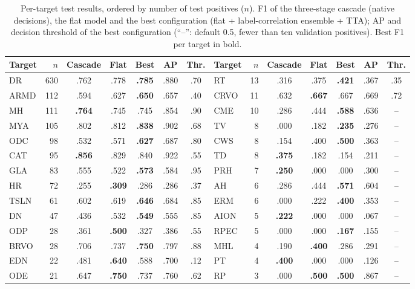\documentclass[conference]{IEEEtran}
\newcommand{\B}[1]{\textbf{#1}}
\begin{document}
\begin{table}[t]
\centering
\caption{Per-target test results, ordered by number of test positives ($n$). F1 of the
three-stage cascade (native decisions), the flat model and the best configuration
(flat + label-correlation ensemble + TTA); AP and decision threshold of the best
configuration (``--'': default 0.5, fewer than ten validation positives). Best F1 per
target in bold.}
\label{tab:pertarget}
\setlength{\tabcolsep}{4.2pt}
\footnotesize
\begin{tabular}{@{}lrccccc|lrccccc@{}}
\toprule
Target & $n$ & Cascade & Flat & Best & AP & Thr. & Target & $n$ & Cascade & Flat & Best & AP & Thr.\\
\midrule
DR & 630 & .762 & .778 & \B{.785} & .880 & .70 & RT & 13 & .316 & .375 & \B{.421} & .367 & .35\\
ARMD & 112 & .594 & .627 & \B{.650} & .657 & .40 & CRVO & 11 & .632 & \B{.667} & .667 & .669 & .72\\
MH & 111 & \B{.764} & .745 & .745 & .854 & .90 & CME & 10 & .286 & .444 & \B{.588} & .636 & --\\
MYA & 105 & .802 & .812 & \B{.838} & .902 & .68 & TV & 8 & .000 & .182 & \B{.235} & .276 & --\\
ODC & 98 & .532 & .571 & \B{.627} & .687 & .80 & CWS & 8 & .154 & .400 & \B{.500} & .363 & --\\
CAT & 95 & \B{.856} & .829 & .840 & .922 & .55 & TD & 8 & \B{.375} & .182 & .154 & .211 & --\\
GLA & 83 & .555 & .522 & \B{.573} & .584 & .95 & PRH & 7 & \B{.250} & .000 & .000 & .300 & --\\
HR & 72 & .255 & \B{.309} & .286 & .286 & .37 & AH & 6 & .286 & .444 & \B{.571} & .604 & --\\
TSLN & 61 & .602 & .619 & \B{.646} & .684 & .85 & ERM & 6 & .000 & .222 & \B{.400} & .353 & --\\
DN & 47 & .436 & .532 & \B{.549} & .555 & .85 & AION & 5 & \B{.222} & .000 & .000 & .067 & --\\
ODP & 28 & .361 & \B{.500} & .327 & .386 & .55 & RPEC & 5 & .000 & .000 & \B{.167} & .155 & --\\
BRVO & 28 & .706 & .737 & \B{.750} & .797 & .88 & MHL & 4 & .190 & \B{.400} & .286 & .291 & --\\
EDN & 22 & .481 & \B{.640} & .588 & .700 & .12 & PT & 4 & \B{.400} & .000 & .000 & .126 & --\\
ODE & 21 & .647 & \B{.750} & .737 & .760 & .62 & RP & 3 & .000 & \B{.500} & \B{.500} & .867 & --\\

\end{tabular}
\end{table}
\end{document}

